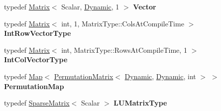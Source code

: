 \begin{DoxyCompactItemize}
typedef \hyperlink{group___core___module_class_eigen_1_1_matrix}{Matrix}$<$ Scalar, \hyperlink{namespace_eigen_ad81fa7195215a0ce30017dfac309f0b2}{Dynamic}, 1 $>$ {\bfseries Vector}
\item 
\mbox{\label{class_eigen_1_1_super_l_u_base_af42c2a35e69ded5dd96bbff3adf519d5}} 
typedef \hyperlink{group___core___module_class_eigen_1_1_matrix}{Matrix}$<$ int, 1, Matrix\+Type\+::\+Cols\+At\+Compile\+Time $>$ {\bfseries Int\+Row\+Vector\+Type}
\item 
\mbox{\label{class_eigen_1_1_super_l_u_base_a4437863f63481a5a8cc9ae8a5566922b}} 
typedef \hyperlink{group___core___module_class_eigen_1_1_matrix}{Matrix}$<$ int, Matrix\+Type\+::\+Rows\+At\+Compile\+Time, 1 $>$ {\bfseries Int\+Col\+Vector\+Type}
\item 
\mbox{\label{class_eigen_1_1_super_l_u_base_ac9c65a00757d1aec9655e3c89fe1a2a0}} 
typedef \hyperlink{group___core___module_class_eigen_1_1_map}{Map}$<$ \hyperlink{group___core___module_class_eigen_1_1_permutation_matrix}{Permutation\+Matrix}$<$ \hyperlink{namespace_eigen_ad81fa7195215a0ce30017dfac309f0b2}{Dynamic}, \hyperlink{namespace_eigen_ad81fa7195215a0ce30017dfac309f0b2}{Dynamic}, int $>$ $>$ {\bfseries Permutation\+Map}
\item 
\mbox{\label{class_eigen_1_1_super_l_u_base_a2a4f84d7bee23175a75b4934bb4c1f68}} 
typedef \hyperlink{group___sparse_core___module_class_eigen_1_1_sparse_matrix}{Sparse\+Matrix}$<$ Scalar $>$ {\bfseries L\+U\+Matrix\+Type}
\end{DoxyCompactItemize}
